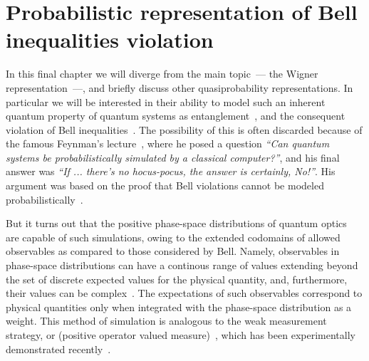 \chapter{Probabilistic representation of Bell inequalities violation}
\label{cha:bell-ineq}

In this final chapter we will diverge from the main topic~--- the Wigner representation~---, and briefly discuss other quasiprobability representations.
In particular we will be interested in their ability to model such an inherent quantum property of quantum systems as entanglement~\cite{Einstein1935}, and the consequent violation of Bell inequalities~\cite{Bell1964}.
The possibility of this is often discarded because of the famous Feynman's lecture~\cite{Feynman1982}, where he posed a question \textit{``Can quantum systems be probabilistically simulated by a classical computer?''}, and his final answer was \textit{``If ... there's no hocus-pocus, the answer is certainly, No!''}.
His argument was based on the proof that Bell violations cannot be modeled probabilistically~\cite{Bell1964}.

But it turns out that the positive phase-space distributions of quantum optics~\cite{Husimi1940,Drummond1980,Hillery1984,Gardiner2004} are capable of such simulations, owing to the extended codomains of allowed observables as compared to those considered by Bell.
Namely, observables in phase-space distributions can have a continous range of values extending beyond the set of discrete expected values for the physical quantity, and, furthermore, their values can be complex~\cite{Reid1986}.
The expectations of such observables correspond to physical quantities only when integrated with the phase-space distribution as a weight.
This method of simulation is analogous to the weak measurement strategy, or  (positive operator valued measure)~\cite{Aharonov1988}, which has been experimentally demonstrated recently~\cite{Goggin2011}.





